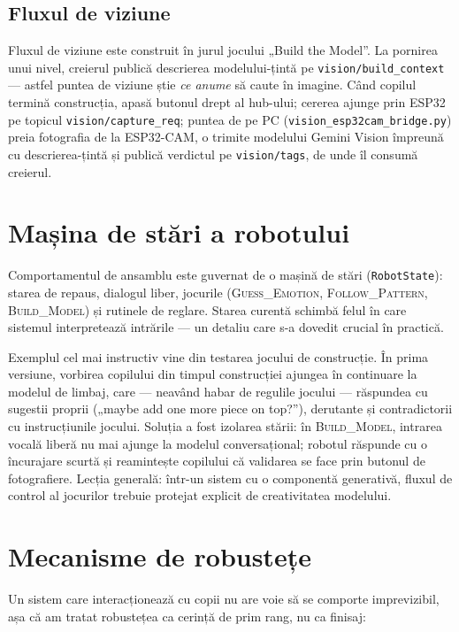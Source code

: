 \subsection{Fluxul de viziune}

Fluxul de viziune este construit în jurul jocului „Build the Model”. La pornirea unui nivel, creierul publică descrierea modelului-țintă pe \texttt{vision/build\_context} — astfel puntea de viziune știe \emph{ce anume} să caute în imagine. Când copilul termină construcția, apasă butonul drept al hub-ului; cererea ajunge prin ESP32 pe topicul \texttt{vision/capture\_req}; puntea de pe PC (\texttt{vision\_esp32cam\_bridge.py}) preia fotografia de la ESP32-CAM, o trimite modelului Gemini Vision împreună cu descrierea-țintă și publică verdictul pe \texttt{vision/tags}, de unde îl consumă creierul.

\section{Mașina de stări a robotului}

Comportamentul de ansamblu este guvernat de o mașină de stări (\texttt{RobotState}): starea de repaus, dialogul liber, jocurile (\textsc{Guess\_Emotion}, \textsc{Follow\_Pattern}, \textsc{Build\_Model}) și rutinele de reglare. Starea curentă schimbă felul în care sistemul interpretează intrările — un detaliu care s-a dovedit crucial în practică.

Exemplul cel mai instructiv vine din testarea jocului de construcție. În prima versiune, vorbirea copilului din timpul construcției ajungea în continuare la modelul de limbaj, care — neavând habar de regulile jocului — răspundea cu sugestii proprii („maybe add one more piece on top?”), derutante și contradictorii cu instrucțiunile jocului. Soluția a fost izolarea stării: în \textsc{Build\_Model}, intrarea vocală liberă nu mai ajunge la modelul conversațional; robotul răspunde cu o încurajare scurtă și reamintește copilului că validarea se face prin butonul de fotografiere. Lecția generală: într-un sistem cu o componentă generativă, fluxul de control al jocurilor trebuie protejat explicit de creativitatea modelului.

\section{Mecanisme de robustețe}

Un sistem care interacționează cu copii nu are voie să se comporte imprevizibil, așa că am tratat robustețea ca cerință de prim rang, nu ca finisaj:


